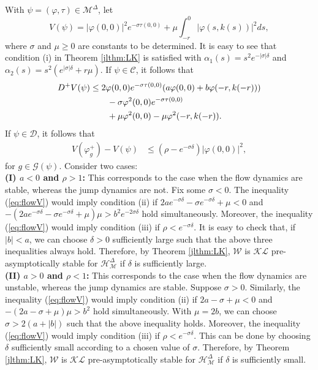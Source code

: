 \documentclass[journal,final,twocolumn]{IEEEtran}
\theoremstyle{definition}
\begin{document}
With $\psi=({\varphi},\tau)\in{\mathcal{M}^{\Delta}}$, let
$$
V(\psi)={\left\vert{{\varphi}(0,0)}\right\vert}^2e^{-\sigma\tau(0,0)}+\mu\int_{-r}^0{\left\vert{{\varphi}(s,k(s))}\right\vert}^2ds,
$$
where $\sigma$ and $\mu\ge 0$ are constants to be determined. It is easy to see that condition (i) in Theorem \ref{jlthm:LK} is satisfied with $\alpha_1(s)=s^2 e^{-{\left\vert{\sigma}\right\vert}\delta}$ and $\alpha_2(s)=s^2 (e^{{\left\vert{\sigma}\right\vert}\delta}+r\mu)$. If $\psi\in {\mathcal{C}}$, it follows that
\begin{align}
D^+V(\psi)&\le 2{\varphi}(0,0)e^{-\sigma\tau(0,0)}(a{\varphi}(0,0)+b{\varphi}(-r,k(-r)))\notag\\
&\qquad-\sigma{\varphi}^2(0,0)e^{-\sigma\tau(0,0)}\notag\\
&\qquad+\mu{\varphi}^2(0,0)-\mu{\varphi}^2(-r,k(-r)).\label{eq:flowV}
\end{align}
If $\psi\in {\mathcal{D}}$, it follows that
\begin{align}
V({\varphi}^+_g)-V(\psi)&\le (\rho-e^{-\sigma\delta}){\left\vert{{\varphi}(0,0)}\right\vert}^2,\label{eq:jumpV}
\end{align}
for $g\in{\mathcal{G}}(\psi)$. Consider two cases:\\
\textbf{(I) $a<0$ and $\rho>1$:} This corresponds to the case when the flow dynamics are stable, whereas the jump dynamics are not. Fix some $\sigma<0$. The inequality (\ref{eq:flowV}) would imply condition (ii) if
$
2ae^{-\sigma\delta}-\sigma e^{-\sigma\delta}+\mu<0
$
and
$
-(2ae^{-\sigma\delta}-\sigma e^{-\sigma\delta}+\mu)\mu>b^2e^{-2\sigma\delta}
$
hold simultaneously. Moreover, the inequality (\ref{eq:flowV}) would imply condition (iii) if
$
\rho<e^{-\sigma\delta}.
$
It is easy to check that, if ${\left\vert{b}\right\vert}<a$, we can choose $\delta>0$ sufficiently large such that the above three inequalities always hold. Therefore, by Theorem \ref{jlthm:LK}, ${\mathcal{W}}$ is ${\mathcal{KL}}$ pre-asymptotically stable for ${\mathcal{H}_{\mathcal{M}}^{\Delta}}$ if $\delta$ is sufficiently large.\\
\textbf{(II) $a>0$ and $\rho<1$:} This corresponds to the case when the flow dynamics are unstable, whereas the jump dynamics are stable. Suppose $\sigma>0$. Similarly, the inequality (\ref{eq:flowV}) would imply condition (ii) if $2a-\sigma+\mu<0$ and $-(2a-\sigma+\mu)\mu>b^2$ hold simultaneously. With $\mu=2b$, we can choose $\sigma>2(a+{\left\vert{b}\right\vert})$ such that the above inequality holds. Moreover, the inequality (\ref{eq:flowV}) would imply condition (iii) if
$
\rho<e^{-\sigma\delta}.
$
This can be done by choosing $\delta$ sufficiently small according to a chosen value of $\sigma$. Therefore, by Theorem \ref{jlthm:LK}, ${\mathcal{W}}$ is ${\mathcal{KL}}$ pre-asymptotically stable for ${\mathcal{H}_{\mathcal{M}}^{\Delta}}$ if $\delta$ is sufficiently small.
\end{document}
